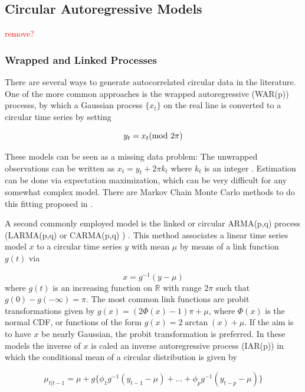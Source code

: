 \documentclass[11pt]{article}
\numberwithin{equation}{section}
\numberwithin{figure}{section}
\begin{document}
\subsection{Circular Autoregressive Models}

\textcolor{red}{remove?}

\subsubsection{Wrapped and Linked Processes}
There are several ways to generate autocorrelated circular data in the literature. One of the more common approaches is the wrapped autoregressive (WAR(p)) processs, by which a Gaussian process $\{x_t\}$ on the real line is converted to a circular time series by setting

\begin{equation}\label{eq:WAR}
y_t = x_t (\textnormal{mod } 2\pi)
\end{equation}

These models can be seen as a missing data problem: The unwrapped observations can be written as $x_t = y_t+2\pi k_t$ where $k_t$ is an integer \cite{Harvey}. Estimation can be done via expectation maximization, which can be very difficult for any somewhat complex model. There are Markov Chain Monte Carlo methods to do this fitting proposed in \cite{Coles}. 

A second commonly employed model is the linked or circular ARMA(p,q) process (LARMA(p,q)  or CARMA(p,q) ) \cite{Harvey}. This method associates a linear time series model $x$ to a circular time series $y$ with mean $\mu$ by means of a link function $g(t)$ via

\begin{equation}\label{eq:larma}
x = g^{-1}(y-\mu)
\end{equation}
where $g(t)$ is an increasing function on $\mathbb{R}$ with range $2\pi$ such that $g(0)-g(-\infty) = \pi$. The most common link functions are probit transformations given by $g(x) = (2 \Phi( x )-1)\pi+\mu$, where $\Phi(x)$ is the normal CDF, or functions of the form $g(x) = 2\arctan(x)+\mu$. If the aim is to have $x$ be nearly Gaussian, the probit transformation is preferred. In these models the inverse of $x$ is caled an inverse autoregressive process (IAR(p)) in which the conditional mean of a circular distribution is given by \cite{Harvey}

\begin{equation}\label{IAR}
\mu_{t|t-1} = \mu+g\{\phi_1g^{-1}(y_{t-1}-\mu)+...+\phi_p g^{-1}(y_{t-p}-\mu)\}
\end{equation}
\end{document}
